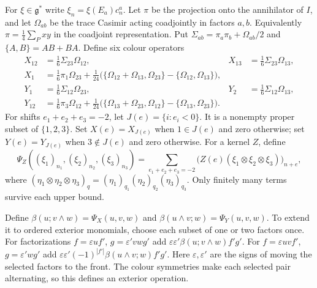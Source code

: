 For $\xi\in\mathfrak g^*$ write $\xi_n=\xi(E_a)c_n^a$.
Let $\pi$ be the projection onto the annihilator of $I$, and let
$\Omega_{ab}$ be the trace Casimir acting coadjointly in factors
$a,b$.  Equivalently $\pi=\frac14\sum_Pxy$ in the coadjoint
representation.  Put
$\Sigma_{ab}=\pi_a\pi_b+\Omega_{ab}/2$ and
$\{A,B\}=AB+BA$.  Define six colour operators
\begin{equation}\label{cyquant:eq:three-mode-colours}
 \begin{aligned}
 X_{12}&=\tfrac16\Sigma_{23}\Omega_{12},&
 X_{13}&=\tfrac16\Sigma_{23}\Omega_{13},\\
 X_1&=\tfrac16\pi_1\Omega_{23}
       +\tfrac1{24}\bigl(\{\Omega_{12}+\Omega_{13},\Omega_{23}\}
                         -\{\Omega_{12},\Omega_{13}\}\bigr),\\
 Y_1&=\tfrac16\Sigma_{12}\Omega_{23},&
 Y_2&=\tfrac16\Sigma_{12}\Omega_{13},\\
 Y_{12}&=\tfrac16\pi_3\Omega_{12}
       +\tfrac1{24}\bigl(\{\Omega_{13}+\Omega_{23},\Omega_{12}\}
                         -\{\Omega_{13},\Omega_{23}\}\bigr).
 \end{aligned}
\end{equation}
For shifts $e_1+e_2+e_3=-2$, let $J(e)=\{i:e_i<0\}$.
It is a nonempty proper subset of $\{1,2,3\}$.
Set $X(e)=X_{J(e)}$ when $1\in J(e)$ and zero otherwise;
set $Y(e)=Y_{J(e)}$ when $3\notin J(e)$ and zero otherwise.
For a kernel $Z$, define
\[
 \Psi_Z((\xi_1)_{n_1},(\xi_2)_{n_2},(\xi_3)_{n_3})
   =\sum_{e_1+e_2+e_3=-2}
           \bigl(Z(e)(\xi_1\otimes\xi_2\otimes\xi_3)\bigr)_{n+e},
\]
where $(\eta_1\otimes\eta_2\otimes\eta_3)_q
=(\eta_1)_{q_1}(\eta_2)_{q_2}(\eta_3)_{q_3}$.
Only finitely many terms survive each upper bound.

Define $\beta(u;v\wedge w)=\Psi_X(u,v,w)$ and
$\beta(u\wedge v;w)=\Psi_Y(u,v,w)$.  To extend it to ordered
exterior monomials, choose each subset of one or two factors once.
For factorizations $f=\varepsilon uf'$, $g=\varepsilon'vwg'$ add
$\varepsilon\varepsilon'\beta(u;v\wedge w)f'g'$.
For $f=\varepsilon uvf'$, $g=\varepsilon'wg'$ add
$\varepsilon\varepsilon'(-1)^{|f'|}\beta(u\wedge v;w)f'g'$.
Here $\varepsilon,\varepsilon'$ are the signs of moving the selected
factors to the front.  The colour symmetries make each selected pair
alternating, so this defines an exterior operation.

